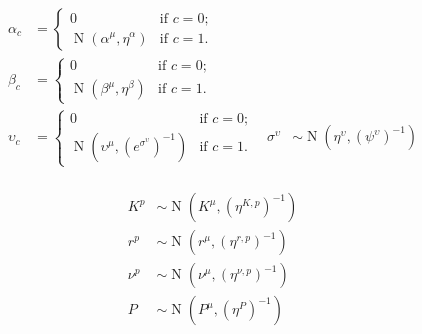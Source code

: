 \documentclass[11pt,a4paper]{article}
\begin{document}
\begin{align*}
\alpha_{c}&=\begin{cases}
0  & \text{if } c=0;\\
\operatorname{N}(\alpha^{\mu},\eta^{\alpha})  & \text{if } c=1.
\end{cases}
\\
\beta_{c}&=\begin{cases}
0  & \text{if } c=0;\\
\operatorname{N}(\beta^{\mu},\eta^{\beta}) & \text{if } c=1.
\end{cases}
\\
\upsilon_{c}&=\begin{cases}
0  & \text{if } c=0;\\
\operatorname{N}(\upsilon^{\mu},({e^{\sigma^{\upsilon}}})^{-1}) & \text{if } c=1.
\end{cases}
&\sigma^{\upsilon} &\sim \operatorname{N}(\eta^{\upsilon}, (\psi^{\upsilon})^{-1} )\\
\end{align*}

\begin{align*}
K^p &\sim \operatorname{N}(K^\mu, ({\eta^{K,p}})^{-1} )\\
r^p &\sim \operatorname{N}(r^\mu, ({\eta^{r,p}})^{-1} )\\
\nu^p &\sim \operatorname{N}(\nu^\mu, ({\eta}^{\nu,p})^{-1} )\\
P &\sim \operatorname{N}(P^\mu, ({\eta^{P}})^{-1} )\\
\end{align*}

\newpage





\end{document}
